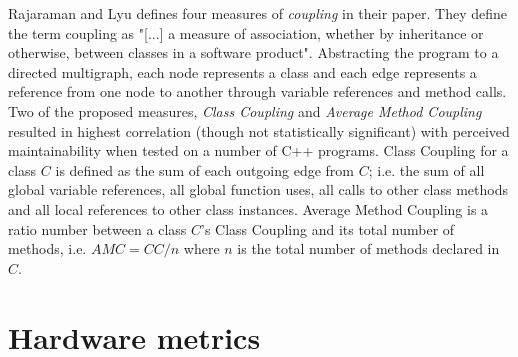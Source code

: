 Rajaraman and Lyu \cite{rajaraman1992reliability} defines four measures of
\textit{coupling} in their paper. They define the term coupling as "[...] a
measure of association, whether by inheritance or otherwise, between classes in
a software product". Abstracting the program to a directed multigraph, each
node represents a class and each edge represents a reference from one node to
another through variable references and method calls. Two of the proposed
measures, \textit{Class Coupling} and \textit{Average Method Coupling} resulted
in highest correlation (though not statistically significant) with perceived
maintainability when tested on a number of C++ programs. Class Coupling for a
class $C$ is defined as the sum of each outgoing edge from $C$; i.e. the sum of
all global variable references, all global function uses, all calls to other
class methods and all local references to other class instances. Average Method
Coupling is a ratio number between a class $C$'s Class Coupling and its total
number of methods, i.e. $AMC = CC / n$ where $n$ is the total number of methods
declared in $C$.

\section{Hardware metrics}
